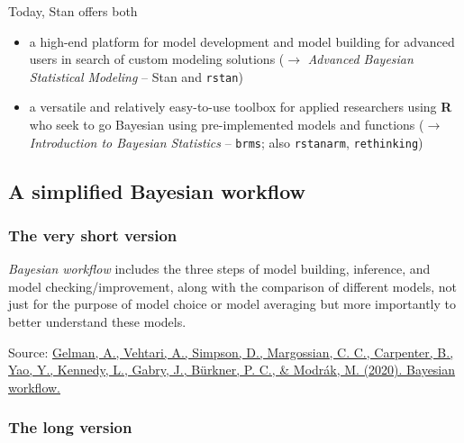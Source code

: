 \documentclass[
  11pt,
]{article}
\providecommand{\tightlist}{%
  \setlength{\itemsep}{0pt}\setlength{\parskip}{0pt}}
\begin{document}
Today, Stan offers both

\begin{itemize}
\tightlist
\item
  a high-end platform for model development and model building for advanced users in search of custom modeling solutions (\(\rightarrow\) \emph{Advanced Bayesian Statistical Modeling} -- Stan and \texttt{rstan})
\item
  a versatile and relatively easy-to-use toolbox for applied researchers using \textbf{R} who seek to go Bayesian using pre-implemented models and functions (\(\rightarrow\) \emph{Introduction to Bayesian Statistics} -- \texttt{brms}; also \texttt{rstanarm}, \texttt{rethinking})
\end{itemize}

\hypertarget{a-simplified-bayesian-workflow}{%
\subsection{A simplified Bayesian workflow}\label{a-simplified-bayesian-workflow}}

\hypertarget{the-very-short-version}{%
\subsubsection{The very short version}\label{the-very-short-version}}

\emph{Bayesian workflow} includes the three steps of model building, inference, and model checking/improvement, along with the comparison of different models, not just for the purpose of model choice or model averaging but more importantly to better understand these models.

Source: \href{https://arxiv.org/abs/2011.01808}{Gelman, A., Vehtari, A., Simpson, D., Margossian, C. C., Carpenter, B., Yao, Y., Kennedy, L., Gabry, J., Bürkner, P. C., \& Modrák, M. (2020). Bayesian workflow.}

\hypertarget{the-long-version}{%
\subsubsection{The long version}\label{the-long-version}}
\end{document}
